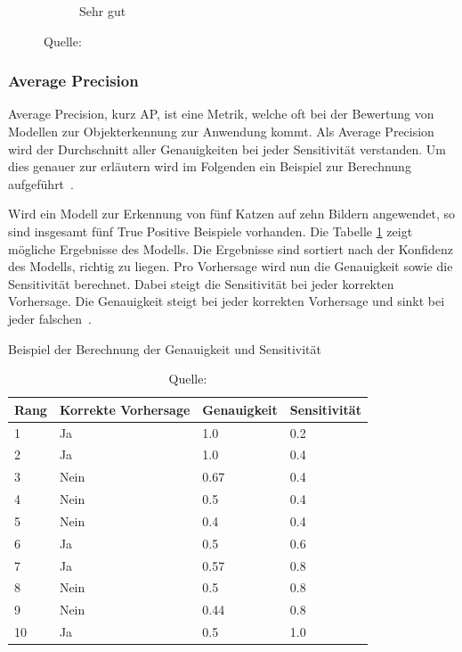 \begin{figure}[h!]
\begin{subfigure}[b]{0.3\linewidth}
        \caption*{Sehr gut} 
        \vspace{2ex}
    \end{subfigure}
    
    \caption*{Quelle: \textcite{IoU}}
\end{figure}

\subsubsection{Average Precision}
\label{chap:ap}

Average Precision, kurz AP, ist eine Metrik, welche oft bei der Bewertung von Modellen zur Objekterkennung zur Anwendung kommt. Als Average Precision wird der Durchschnitt aller Genauigkeiten bei jeder Sensitivität verstanden. Um dies genauer zur erläutern wird im Folgenden ein Beispiel zur Berechnung aufgeführt~\autocite{AP}.

Wird ein Modell zur Erkennung von fünf Katzen auf zehn Bildern angewendet, so sind insgesamt fünf True Positive Beispiele vorhanden. Die Tabelle \ref{tab:ap-example} zeigt mögliche Ergebnisse des Modells. Die Ergebnisse sind sortiert nach der Konfidenz des Modells, richtig zu liegen. Pro Vorhersage wird nun die Genauigkeit sowie die Sensitivität berechnet. Dabei steigt die Sensitivität bei jeder korrekten Vorhersage. Die Genauigkeit steigt bei jeder korrekten Vorhersage und sinkt bei jeder falschen~\autocite{AP}.

\begin{table}[h!]
    \captionsetup{width=.9\linewidth}
    \caption{Beispiel der Berechnung der Genauigkeit und Sensitivität}
    \label{tab:ap-example}
    \centering
    \begin{tabular}{|l|l|l|l|} 
    \hline
    Rang & Korrekte Vorhersage & Genauigkeit & Sensitivität  \\ 
    \hline
    1    & Ja                  & 1.0         & 0.2           \\ 
    \hline
    2    & Ja                  & 1.0         & 0.4           \\ 
    \hline
    3    & Nein                & 0.67        & 0.4           \\ 
    \hline
    4    & Nein                & 0.5         & 0.4           \\ 
    \hline
    5    & Nein                & 0.4         & 0.4           \\ 
    \hline
    6    & Ja                  & 0.5         & 0.6           \\ 
    \hline
    7    & Ja                  & 0.57        & 0.8           \\ 
    \hline
    8    & Nein                & 0.5         & 0.8           \\ 
    \hline
    9    & Nein                & 0.44        & 0.8           \\ 
    \hline
    10   & Ja                  & 0.5         & 1.0           \\
    \hline
    \end{tabular}
    \caption*{Quelle: \textcite{AP}}
\end{table}

